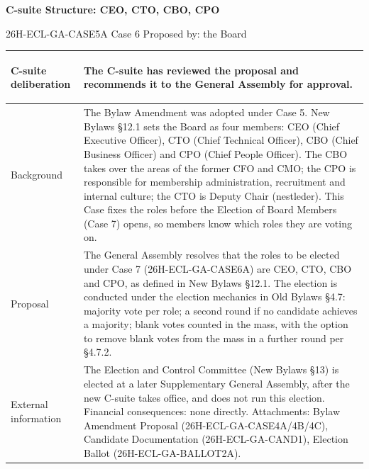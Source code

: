\documentclass{../../../Common/Latex/Templates/rapport}
\begin{document}
\reportmainmatter
\small
\setlength{\parindent}{0pt}
\setlength{\tabcolsep}{6pt}
\renewcommand{\arraystretch}{1.2}

\begin{center}
  {\Large\bfseries C-suite Structure: CEO, CTO, CBO, CPO}\par
  \vspace{0.15cm}
  {\normalsize 26H-ECL-GA-CASE5A \textperiodcentered{} Case 6 \textperiodcentered{} Proposed by: the Board}\par
  \vspace{0.1cm}
  {\small \meetingline}\par
\end{center}

\vspace{0.3cm}
\begin{tabularx}{\textwidth}{|>{\bfseries\raggedright\arraybackslash}p{4.2cm}|X|}
  \hline
  C-suite deliberation & The C-suite has reviewed the proposal and recommends it to the General Assembly for approval.                                                                                                                                                                                                                                                                                                                                                                                                                                                  \\
  \hline
  Background           & The Bylaw Amendment was adopted under Case 5. New Bylaws \S12.1 sets the Board as four members: CEO (Chief Executive Officer), CTO (Chief Technical Officer), CBO (Chief Business Officer) and CPO (Chief People Officer). The CBO takes over the areas of the former CFO and CMO; the CPO is responsible for membership administration, recruitment and internal culture; the CTO is Deputy Chair (nestleder). This Case fixes the roles before the Election of Board Members (Case 7) opens, so members know which roles they are voting on. \\
  \hline
  Proposal             & The General Assembly resolves that the roles to be elected under Case 7 (26H-ECL-GA-CASE6A) are CEO, CTO, CBO and CPO, as defined in New Bylaws \S12.1. The election is conducted under the election mechanics in Old Bylaws \S4.7: majority vote per role; a second round if no candidate achieves a majority; blank votes counted in the mass, with the option to remove blank votes from the mass in a further round per \S4.7.2.                                                                                                           \\
  \hline
  External information & The Election and Control Committee (New Bylaws \S13) is elected at a later Supplementary General Assembly, after the new C-suite takes office, and does not run this election. Financial consequences: none directly. Attachments: Bylaw Amendment Proposal (26H-ECL-GA-CASE4A/4B/4C), Candidate Documentation (26H-ECL-GA-CAND1), Election Ballot (26H-ECL-GA-BALLOT2A).                                                                                                                                                                      \\
  \hline
\end{tabularx}
\end{document}
